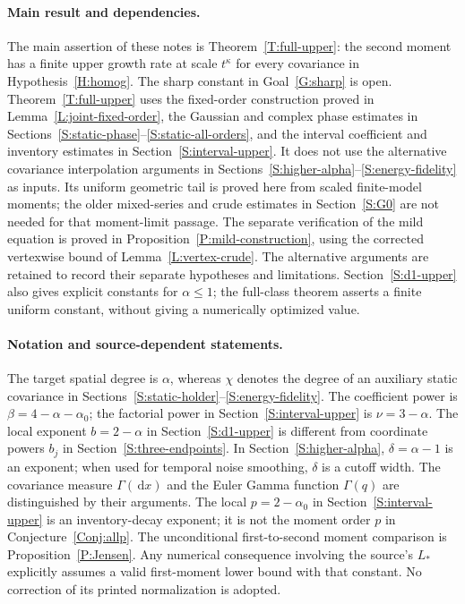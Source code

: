 \documentclass[12pt]{article}
\numberwithin{equation}{section}
\theoremstyle{definition}
\newcommand{\ud}{\,\mathrm{d}}
\begin{document}
\paragraph{Main result and dependencies.}
The main assertion of these notes is Theorem~\ref{T:full-upper}: the
second moment has a finite upper growth rate at scale $t^\kappa$ for
every covariance in Hypothesis~\ref{H:homog}. The sharp constant in
Goal~\ref{G:sharp} is open. Theorem~\ref{T:full-upper} uses the fixed-order
construction proved in Lemma~\ref{L:joint-fixed-order}, the Gaussian
and complex phase estimates in Sections~\ref{S:static-phase}--\ref{S:static-all-orders},
and the interval coefficient and inventory estimates in
Section~\ref{S:interval-upper}. It does not use the alternative covariance
interpolation arguments in Sections~\ref{S:higher-alpha}--\ref{S:energy-fidelity}
as inputs. Its uniform geometric tail is proved here from scaled finite-model
moments; the older mixed-series and crude estimates in
Section~\ref{S:G0} are not needed for that moment-limit passage.
The separate verification of the mild equation is proved in
Proposition~\ref{P:mild-construction}, using the corrected
vertexwise bound of Lemma~\ref{L:vertex-crude}. The alternative
arguments are retained to record their separate hypotheses
and limitations. Section~\ref{S:d1-upper} also gives explicit constants for
$\alpha\le1$; the full-class theorem asserts a finite uniform constant,
without giving a numerically optimized value.

\paragraph{Notation and source-dependent statements.}
The target spatial degree is $\alpha$, whereas $\chi$ denotes the degree
of an auxiliary static covariance in
Sections~\ref{S:static-holder}--\ref{S:energy-fidelity}.
The coefficient power is $\beta=4-\alpha-\alpha_0$; the factorial power in
Section~\ref{S:interval-upper} is $\nu=3-\alpha$.
The local exponent $b=2-\alpha$ in Section~\ref{S:d1-upper} is different
from coordinate powers $b_j$ in Section~\ref{S:three-endpoints}.
In Section~\ref{S:higher-alpha}, $\delta=\alpha-1$ is an exponent;
when used for temporal noise smoothing, $\delta$ is a cutoff width.
The covariance measure $\Gamma(\ud x)$ and the Euler Gamma function
$\Gamma(q)$ are distinguished by their arguments. The local
$p=2-\alpha_0$ in Section~\ref{S:interval-upper} is an inventory-decay
exponent; it is not the moment order $p$ in Conjecture~\ref{Conj:allp}.
The unconditional first-to-second moment comparison is
Proposition~\ref{P:Jensen}. Any numerical consequence involving the
source's $L_*$ explicitly assumes a valid first-moment lower bound with
that constant. No correction of its printed normalization is adopted.
\end{document}
